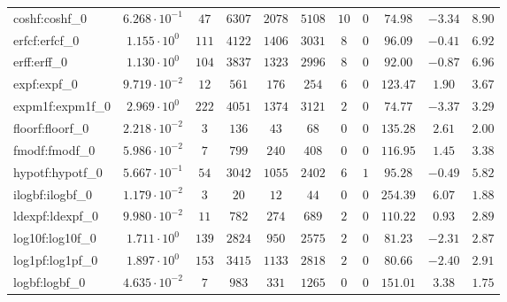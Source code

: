 \begin{tabular}{|l|c|c|c|c|c|c|c|c|c|c|}
coshf:coshf\_0               & $ 6.268 \cdot 10^{-1} $ & $ 47     $ & $ 6307   $ & $ 2078  $ & $ 5108  $ & $ 10  $ & $ 0 $ & $ 74.98       $ & $ -3.34   $ & $ 8.90    $ \\
erfcf:erfcf\_0               & $ 1.155 \cdot 10^{0}  $ & $ 111    $ & $ 4122   $ & $ 1406  $ & $ 3031  $ & $ 8   $ & $ 0 $ & $ 96.09       $ & $ -0.41   $ & $ 6.92    $ \\
erff:erff\_0                 & $ 1.130 \cdot 10^{0}  $ & $ 104    $ & $ 3837   $ & $ 1323  $ & $ 2996  $ & $ 8   $ & $ 0 $ & $ 92.00       $ & $ -0.87   $ & $ 6.96    $ \\
expf:expf\_0                 & $ 9.719 \cdot 10^{-2} $ & $ 12     $ & $ 561    $ & $ 176   $ & $ 254   $ & $ 6   $ & $ 0 $ & $ 123.47      $ & $ 1.90    $ & $ 3.67    $ \\
expm1f:expm1f\_0             & $ 2.969 \cdot 10^{0}  $ & $ 222    $ & $ 4051   $ & $ 1374  $ & $ 3121  $ & $ 2   $ & $ 0 $ & $ 74.77       $ & $ -3.37   $ & $ 3.29    $ \\
floorf:floorf\_0             & $ 2.218 \cdot 10^{-2} $ & $ 3      $ & $ 136    $ & $ 43    $ & $ 68    $ & $ 0   $ & $ 0 $ & $ 135.28      $ & $ 2.61    $ & $ 2.00    $ \\
fmodf:fmodf\_0               & $ 5.986 \cdot 10^{-2} $ & $ 7      $ & $ 799    $ & $ 240   $ & $ 408   $ & $ 0   $ & $ 0 $ & $ 116.95      $ & $ 1.45    $ & $ 3.38    $ \\
hypotf:hypotf\_0             & $ 5.667 \cdot 10^{-1} $ & $ 54     $ & $ 3042   $ & $ 1055  $ & $ 2402  $ & $ 6   $ & $ 1 $ & $ 95.28       $ & $ -0.49   $ & $ 5.82    $ \\
ilogbf:ilogbf\_0             & $ 1.179 \cdot 10^{-2} $ & $ 3      $ & $ 20     $ & $ 12    $ & $ 44    $ & $ 0   $ & $ 0 $ & $ 254.39      $ & $ 6.07    $ & $ 1.88    $ \\
ldexpf:ldexpf\_0             & $ 9.980 \cdot 10^{-2} $ & $ 11     $ & $ 782    $ & $ 274   $ & $ 689   $ & $ 2   $ & $ 0 $ & $ 110.22      $ & $ 0.93    $ & $ 2.89    $ \\
log10f:log10f\_0             & $ 1.711 \cdot 10^{0}  $ & $ 139    $ & $ 2824   $ & $ 950   $ & $ 2575  $ & $ 2   $ & $ 0 $ & $ 81.23       $ & $ -2.31   $ & $ 2.87    $ \\
log1pf:log1pf\_0             & $ 1.897 \cdot 10^{0}  $ & $ 153    $ & $ 3415   $ & $ 1133  $ & $ 2818  $ & $ 2   $ & $ 0 $ & $ 80.66       $ & $ -2.40   $ & $ 2.91    $ \\
logbf:logbf\_0               & $ 4.635 \cdot 10^{-2} $ & $ 7      $ & $ 983    $ & $ 331   $ & $ 1265  $ & $ 0   $ & $ 0 $ & $ 151.01      $ & $ 3.38    $ & $ 1.75    $ \\

\end{tabular}
